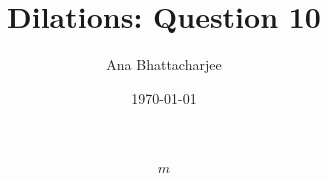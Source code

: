 \documentclass{article}
\begin{document}
\title{Dilations: Question 10}
\author{Ana Bhattacharjee}
\date{\today}

\begin{center}
\begin{align}
  m
\end{align}
\end{center}
\end{document}
